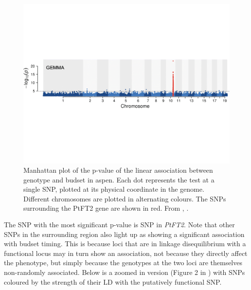 \begin{figure}
\begin{center}
\includegraphics[width=\textwidth]{Journal_figs/Quant_gen/Wang_GWAS_poplar/Wang_Fig_just_Manhattan.pdf}
\end{center}

\caption{Manhattan plot of the p-value of the linear association
  between genotype and budset in aspen. Each dot represents the test at a single SNP,
  plotted at its physical coordinate in the genome. Different chromosomes
  are plotted in alternating colours. The SNPs surrounding the PtFT2
  gene are shown in red. From \citet{wang:18}, \PLOSccBY. } \label{fig:Apsen_Manhattan}
\end{figure}
The SNP with the most significant p-value is SNP in  {\it PtFT2}. Note
that other SNPs in the surrounding region also light up as showing a
significant association with budset timing. This is because loci that
are in linkage disequilibrium with a functional locus may in turn show an
association, not because they directly affect the phenotype, but simply
because the genotypes at the two loci are themselves non-randomly
associated. Below is a zoomed in version (Figure 2 in \citet{wang:18}) with SNPs coloured by the
strength of their LD with the putatively functional SNP.
